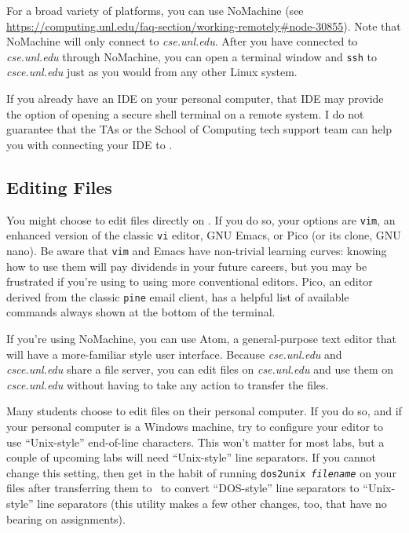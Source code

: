 For a broad variety of platforms, you can use NoMachine (see
\url{https://computing.unl.edu/faq-section/working-remotely#node-30855}). Note
that NoMachine will only connect to \textit{cse.unl.edu}. After you have
connected to \textit{cse.unl.edu} through NoMachine, you can open a terminal
window and \texttt{ssh} to \textit{csce.unl.edu} just as you would from any
other Linux system.

If you already have an IDE on your personal computer, that IDE may provide the
option of opening a secure shell terminal on a remote system. I do not
guarantee that the TAs or the School of Computing tech support team can help
you with connecting your IDE to \runtimeenvironment.

\subsection{Editing Files}

You might choose to edit files directly on \runtimeenvironment. If you do so,
your options are \texttt{vim}, an enhanced version of the classic \texttt{vi}
editor, GNU Emacs, or Pico (or its clone, GNU nano). Be aware that \texttt{vim}
and Emacs have non-trivial learning curves: knowing how to use them will pay
dividends in your future careers, but you may be frustrated if you're using to
using more conventional editors. Pico, an editor derived from the classic
\texttt{pine} email client, has a helpful list of available commands always
shown at the bottom of the terminal.

If you're using NoMachine, you can use Atom, a general-purpose text editor that
will have a more-familiar style user interface. Because \textit{cse.unl.edu}
and \textit{csce.unl.edu} share a file server, you can edit files on
\textit{cse.unl.edu} and use them on \textit{csce.unl.edu} without having to
take any action to transfer the files.

Many students choose to edit files on their personal computer. If you do so,
and if your personal computer is a Windows machine, try to configure your
editor to use ``Unix-style'' end-of-line characters. This won't matter for most
labs, but a couple of upcoming labs will need ``Unix-style'' line separators.
If you cannot change this setting, then get in the habit of running
\texttt{dos2unix \textit{filename}} on your files after transferring them to
\runtimeenvironment\ to convert ``DOS-style'' line separators to ``Unix-style''
line separators (this utility makes a few other changes, too, that have no
bearing on \coursenumber assignments).

